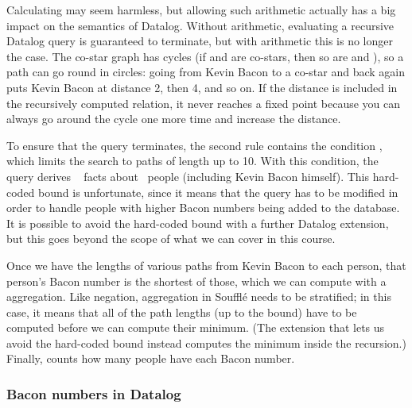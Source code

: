 Calculating  may seem harmless, but allowing such arithmetic actually has a big impact on the semantics of Datalog.
Without arithmetic, evaluating a recursive Datalog query is guaranteed to terminate, but with arithmetic this is no longer the case.
The co-star graph has cycles (if  and  are co-stars, then so are  and ), so a path can go round in circles: going from Kevin Bacon to a co-star and back again puts Kevin Bacon at distance 2, then 4, and so on.
If the distance is included in the recursively computed relation, it never reaches a fixed point because you can always go around the cycle one more time and increase the distance.

To ensure that the query terminates, the second  rule contains the condition , which limits the search to paths of length up to 10.
With this condition, the query derives \recbacondistances\  facts about \recbaconpeople\ people (including Kevin Bacon himself).
This hard-coded bound is unfortunate, since it means that the query has to be modified in order to handle people with higher Bacon numbers being added to the database.
It is possible to avoid the hard-coded bound with a further Datalog extension, but this goes beyond the scope of what we can cover in this course.

Once we have the lengths of various paths from Kevin Bacon to each person, that person's Bacon number is the shortest of those, which we can compute with a  aggregation.
Like negation, aggregation in Soufflé needs to be stratified; in this case, it means that all of the path lengths (up to the bound) have to be computed before we can compute their minimum.
(The extension that lets us avoid the hard-coded bound instead computes the minimum inside the recursion.)
Finally,  counts how many people have each Bacon number.

\begin{frame}
    \label{s:datalog-bacon}
    \frametitle{Bacon numbers in Datalog}
\end{frame}
\label{l:datalog-bacon}

